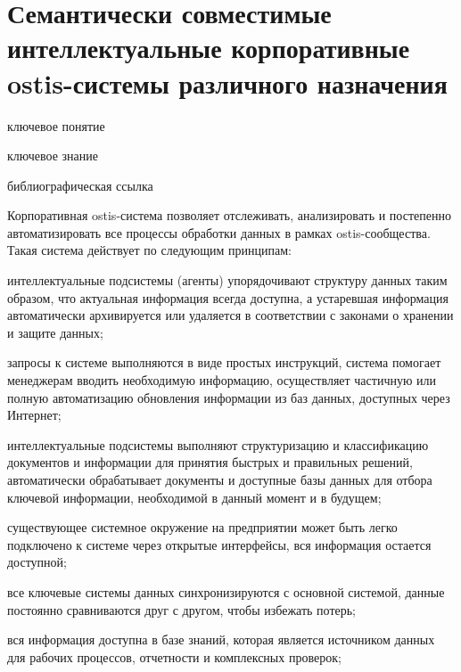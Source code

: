 \section{Семантически совместимые интеллектуальные корпоративные ostis-системы различного назначения}
{\label{sec_corporate_ostis_system}} 

\begin{SCn}

\bigskip

\begin{scnrelfromlist}{ключевое понятие}
\end{scnrelfromlist}

\bigskip

\begin{scnrelfromlist}{ключевое знание}
\end{scnrelfromlist}

\bigskip

\begin{scnrelfromlist}{библиографическая ссылка}
\end{scnrelfromlist}

\end{SCn}


Корпоративная ostis-система позволяет отслеживать, анализировать и постепенно автоматизировать все процессы обработки данных в рамках ostis-сообщества. 
Такая система действует по следующим принципам:
\begin{textitemize}
    \item интеллектуальные подсистемы (агенты) упорядочивают структуру данных таким образом, что актуальная информация всегда доступна, а устаревшая информация автоматически архивируется или удаляется в соответствии с законами о хранении и защите данных;
    \item запросы к системе выполняются в виде простых инструкций, система помогает менеджерам вводить необходимую информацию, осуществляет частичную или полную автоматизацию обновления информации из баз данных, доступных через Интернет;
    \item интеллектуальные подсистемы выполняют структуризацию и классификацию документов и информации для принятия быстрых и правильных решений, автоматически обрабатывает документы и доступные базы данных для отбора ключевой информации, необходимой в данный момент и в будущем;
    \item существующее системное окружение на предприятии может быть легко подключено к системе через открытые интерфейсы, вся информация остается доступной;
    \item все ключевые системы данных синхронизируются с основной системой, данные постоянно сравниваются друг с другом, чтобы избежать потерь;
    \item вся информация доступна в базе знаний, которая является источником данных для рабочих процессов, отчетности и комплексных проверок;
\end{textitemize}

